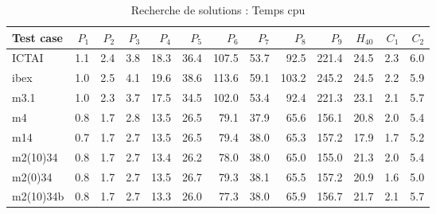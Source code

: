 \documentclass{article}
\begin{document}
\begin{table*}[htb]
\caption{Recherche de solutions : Temps cpu}
\begin{center}
\begin{tabular}{|l||r|r|r|r|r|r|r|r|r|r||r|r|}
\hline
Test case & $P_1$ & $P_2$ & $P_3$ & $P_4$ & $P_5$ & $P_6$ & $P_7$ & $P_8$ & $P_9$ & $H_{40}$ & $C_1$ & $C_2$\\
\hline
ICTAI &1.1& 2.4   & 3.8  &18.3 & 36.4 &107.5&   53.7  &  92.5 &   221.4 & 24.5 &2.3 &6.0\\
ibex & 1.0 & 2.5 & 4.1 & 19.6 & 38.6 & 113.6 & 59.1 &103.2 & 245.2 & 24.5 & 2.2 & 5.9 \\
m3.1 & 1.0 & 2.3 & 3.7 & 17.5 & 34.5 & 102.0 & 53.4 & 92.4 & 221.3 & 23.1 & 2.1 & 5.7\\
m4  & 0.8  & 1.7 & 2.8 & 13.5 & 26.5 & 79.1 & 37.9 & 65.6 & 156.1 & 20.8 & 2.0& 5.4\\
m14&0.7 & 1.7 & 2.7 & 13.5 & 26.5 & 79.4 & 38.0 & 65.3 & 157.2 & 17.9 & 1.7 & 5.2 \\
m2(10)34 & 0.8 & 1.7 &  2.7 & 13.4 & 26.2 & 78.0 & 38.0 & 65.0 & 155.0 & 21.3 & 2.0 & 5.4 \\
m2(0)34 &    0.8 & 1.7 &  2.7 & 13.5 & 26.7 & 79.3 & 38.1 & 65.5 & 157.2 & 20.9 & 1.6 & 5.0  \\
m2(10)34b & 0.8&  1.7&   2.7  &  13.3 & 26.0 & 77.3 & 38.0 & 65.9 & 156.7 & 21.7 & 2.1  & 5.7 \\
\hline
\end{tabular}
\end{center}
\label{planeresults}
\end{table*}
\end{document}
